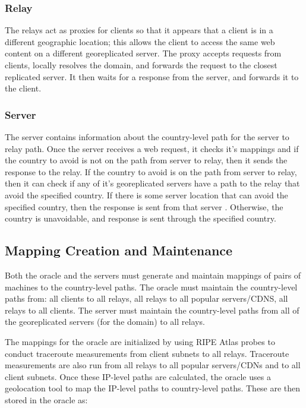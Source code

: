 \subsubsection{Relay} The relays act as proxies for clients so that it appears that a client is in a different geographic location; this allows the client to access the same web content on a different georeplicated server.  The proxy accepts requests from clients, locally resolves the domain, and forwards the request to the closest replicated server.  It then waits for a response from the server, and forwards it to the client.   

\subsubsection{Server} The server contains information about the country-level path for the server to relay path.  Once the server receives a web request, it checks it's mappings and if the country to avoid is not on the path from server to relay, then it sends the response to the relay.  If the country to avoid is on the path from server to relay, then it can check if any of it's georeplicated servers have a path to the relay that avoid the specified country.  If there is some server location that can avoid the specified country, then the response is sent from that server .  Otherwise, the country is unavoidable, and response is sent through the specified country.

\subsection{Mapping Creation and Maintenance}
\label{maps}

Both the oracle and the servers must generate and maintain mappings of pairs of machines to the country-level paths.  The oracle must maintain the country-level paths from: all clients to all relays, all relays to all popular servers/CDNS, all relays to all clients.  The server must maintain the country-level paths from all of the georeplicated servers (for the domain) to all relays.  

The mappings for the oracle are initialized by using RIPE Atlas probes to conduct traceroute measurements from client subnets to all relays.  Traceroute measurements are also run from all relays to all popular servers/CDNs and to all client subnets.  Once these IP-level paths are calculated, the oracle uses a geolocation tool to map the IP-level paths to country-level paths.  These are then stored in the oracle as:

